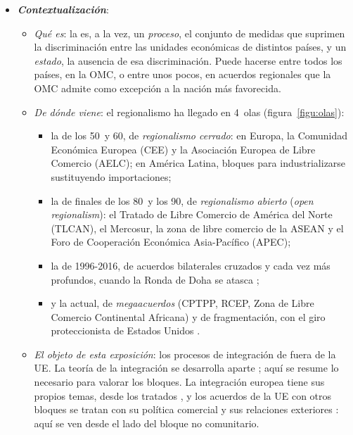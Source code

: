 \documentclass[11pt]{article}
\begin{document}
\begin{itemize}
\item \textbf{\emph{Contextualización}}:
  \begin{itemize}
  \item \emph{Qué es}: la  es, a la vez, un \emph{proceso}, el conjunto de medidas que suprimen la discriminación entre las unidades económicas de distintos países, y un \emph{estado}, la ausencia de esa discriminación\nocite{Balassa1961Theory}. Puede hacerse entre todos los países, en la OMC, o entre unos pocos, en acuerdos regionales que la OMC admite como excepción a la nación más favorecida.
  \item \emph{De dónde viene}: el regionalismo ha llegado en 4~olas (figura~\ref{figu:olas}):
    \begin{itemize}
    \item la de los 50~y 60, de \emph{regionalismo cerrado}: en Europa, la Comunidad Económica Europea (CEE) y la Asociación Europea de Libre Comercio (AELC); en América Latina, bloques para industrializarse sustituyendo importaciones;
    \item la de finales de los 80~y los 90, de \emph{regionalismo abierto} (\emph{open regionalism}): el Tratado de Libre Comercio de América del Norte (TLCAN), el Mercosur, la zona de libre comercio de la ASEAN y el Foro de Cooperación Económica Asia-Pacífico (APEC);
    \item la de 1996-2016, de acuerdos bilaterales cruzados y cada vez más profundos, cuando la Ronda de Doha se atasca ;
    \item y la actual, de \emph{megaacuerdos} (CPTPP, RCEP, Zona de Libre Comercio Continental Africana) y de fragmentación, con el giro proteccionista de Estados Unidos .
    \end{itemize}
  \item \emph{El objeto de esta exposición}: los procesos de integración de fuera de la UE. La teoría de la integración se desarrolla aparte ; aquí se resume lo necesario para valorar los bloques. La integración europea tiene sus propios temas, desde los tratados , y los acuerdos de la UE con otros bloques se tratan con su política comercial y sus relaciones exteriores  : aquí se ven desde el lado del bloque no comunitario.
  \end{itemize}

\begin{infografia}[H]
\centering
\caption{Las 4~olas del regionalismo, 1957-2026}\label{figu:olas}
\end{infografia}


\end{itemize}
\end{document}
